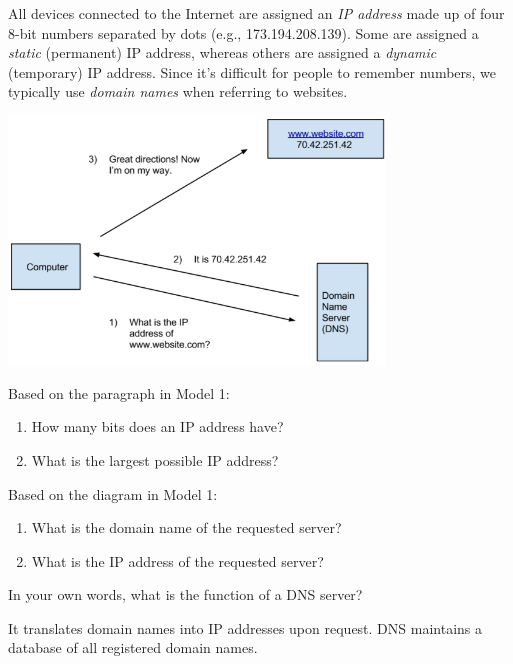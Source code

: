 

All devices connected to the Internet are assigned an \emph{IP address} made up of four 8-bit numbers separated by dots (e.g., 173.194.208.139). Some are assigned a \emph{static} (permanent) IP address, whereas others are assigned a \emph{dynamic} (temporary) IP address. Since it's difficult for people to remember numbers, we typically use \emph{domain names} when referring to websites.

\begin{center}
\includegraphics[width=0.75\textwidth]{CSP/dns1.png}
\end{center}




\Q Based on the paragraph in Model 1:
\begin{enumerate}
\item How many bits does an IP address have? 
\item What is the largest possible IP address? 
\end{enumerate}


\Q Based on the diagram in Model 1:
\begin{enumerate}
\item What is the domain name of the requested server? 
\item What is the IP address of the requested server? 
\end{enumerate}


\Q In your own words, what is the function of a DNS server?

\begin{answer}
It translates domain names into IP addresses upon request.
DNS maintains a database of all registered domain names.
\end{answer}


